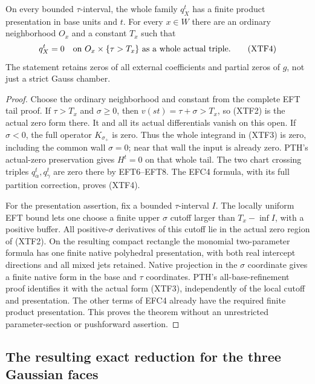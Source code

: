 \begin{theorem}
On every bounded $\tau$-interval, the whole family $q_X^t$ has a
finite product presentation in base units and $t$.  For every
$x\in W$ there are an ordinary neighborhood $O_x$ and a constant
$T_x$ such that
\[
              q_X^t=0\quad\hbox{on }O_x\times\{\tau>T_x\}
                          \text{ as a whole actual triple}.
 \tag{XTF4}
\]
The statement retains zeros of all external coefficients and partial
zeros of $g$, not just a strict Gauss chamber.
\end{theorem}

\begin{proof}
Choose the ordinary neighborhood and constant from the complete EFT
tail proof.  If $\tau>T_x$ and $\sigma\ge0$, then
$v(st)=\tau+\sigma>T_x$, so (XTF2) is the actual zero form there.
It and all its actual differentials vanish on this open.  If
$\sigma<0$, the full operator $K_{\sigma_+}$ is zero.  Thus the
whole integrand in (XTF3) is zero, including the common wall
$\sigma=0$; near that wall the input is already zero.  PTH's
actual-zero preservation gives $H^t=0$ on that whole tail.
The two chart crossing triples $q_\alpha^t,q_\gamma^t$ are zero
there by EFT6--EFT8.  The EFC4 formula, with its full partition
correction, proves (XTF4).

For the presentation assertion, fix a bounded $\tau$-interval $I$.
The locally uniform EFT bound lets one choose a finite upper
$\sigma$ cutoff larger than $T_x-\inf I$, with a positive buffer.
All positive-$\sigma$ derivatives of this cutoff lie in the actual
zero region of (XTF2).  On the resulting compact rectangle the
monomial two-parameter formula has one finite native polyhedral
presentation, with both real intercept directions and all mixed
jets retained.  Native projection in the $\sigma$ coordinate gives
a finite native form in the base and $\tau$ coordinates.  PTH's
all-base-refinement proof identifies it with the actual form (XTF3),
independently of the local cutoff and presentation.  The other terms
of EFC4 already have the required finite product presentation.
This proves the theorem without an unrestricted parameter-section
or pushforward assertion.
\end{proof}

\subsection{The resulting exact reduction for the three Gaussian faces}

